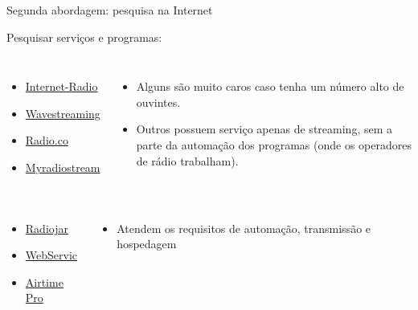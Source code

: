\begin{frame}{Segunda abordagem: pesquisa na Internet}

Pesquisar serviços e programas:

\begin{columns}


\begin{itemize}
\tightlist
\item
  \href{https://www.internet-radio.com/servers/}{Internet-Radio}
\item
  \href{http://www.wavestreaming.com/}{Wavestreaming}
\item
  \href{https://radio.co/pricing}{Radio.co}
\item
  \href{https://myradiostream.com/}{Myradiostream}
\end{itemize}

\hrulefill

\pause


\begin{itemize}
\tightlist
\item
  Alguns são muito caros caso tenha um número alto de ouvintes.
\item
  Outros possuem serviço apenas de streaming, sem a parte da automação
  dos programas (onde os operadores de rádio trabalham).
\end{itemize}

\end{columns}

\pause

\begin{columns}


\begin{itemize}
\tightlist
\item
  \href{https://www.radiojar.com}{Radiojar}
\item
  \href{http://host.webservic.com.br/V3/streaming_whmsonic.php}{WebServic}
\item
  \href{https://www.airtime.pro/pricing/}{Airtime Pro}
\end{itemize}

\pause


\begin{itemize}
\tightlist
\item
  Atendem os requisitos de automação, transmissão e hospedagem
\end{itemize}

\end{columns}

\end{frame}

